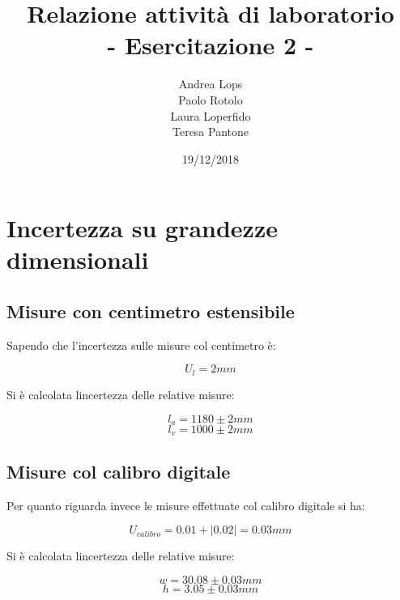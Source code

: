 \documentclass[a4paper]{article}
\title{\textbf{Relazione attività di laboratorio}\\{\normalsize - Esercitazione 2 -}}
\author{Andrea Lops\\
		Paolo Rotolo\\
		Laura Loperfido\\
		Teresa Pantone
	   }
\date{19/12/2018}
\begin{document}
\maketitle

\lstset{language=Matlab}

\section {Incertezza su grandezze dimensionali}
\subsection{Misure con centimetro estensibile}
Sapendo che l'incertezza sulle misure col centimetro è:
\begin{Large} 
	\begin{equation}
		U_{l} = 2mm
	 \end{equation}
\end{Large}
Si è calcolata lincertezza delle relative misure: 
\begin{Large} 
	\begin{equation}
		l_a = 1180\pm2mm
	 \end{equation}
	 \begin{equation}
		l_v = 1000\pm2mm
	 \end{equation}
\end{Large}
\subsection{Misure col calibro digitale}
Per quanto riguarda invece le misure effettuate col calibro digitale si ha: 
\begin{Large} 
	\begin{equation}
		U_{calibro} = 0.01 + |0.02| = 0.03mm
	 \end{equation}
\end{Large}
Si è calcolata lincertezza delle relative misure: 
\begin{Large} 
	\begin{equation}
		w = 30.08\pm0.03mm
	 \end{equation}
	 \begin{equation}
		h = 3.05\pm0.03mm
	 \end{equation}
\end{Large}
\end{document}
